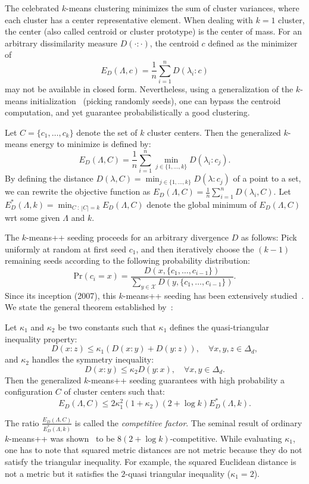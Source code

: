 \documentclass[graybox]{svmult}
\def\calX{\mathcal{X}}
\begin{document}
The celebrated $k$-means clustering minimizes the sum of cluster variances, where each cluster has a center representative element.
When dealing with $k=1$ cluster, the center  (also called  centroid or cluster prototype) is the center of mass.
For an arbitrary dissimilarity measure $D(\cdot:\cdot)$, the centroid $c$ defined as the minimizer of
$$
E_D(\Lambda,c) = \frac{1}{n} \sum_{i=1}^n D(\lambda_i:c)
$$
may not be available in closed form. 
Nevertheless, using a generalization of the $k$-means initialization~\cite{kmeanspp-2007}
(picking randomly seeds), one can bypass the centroid computation, and yet guarantee probabilistically a good clustering.

Let $C=\{c_1,\ldots, c_k\}$ denote the set of $k$ cluster centers.
Then the generalized $k$-means energy to minimize is defined by:
$$
E_D(\Lambda,C) = \frac{1}{n}\sum_{i=1}^n \min_{j\in\{1,\ldots,k\}} D(\lambda_i:c_j).
$$
By defining the distance $D(\lambda,C)=\min_{j\in\{1,\ldots,k\}} D(\lambda:c_j)$ of a point to a set,
we can rewrite the objective function as $E_D(\Lambda,C) = \frac{1}{n}\sum_{i=1}^n D(\lambda_i,C)$.
Let $E_D^*(\Lambda,k)=\min_{C\ :\ |C|=k} E_D(\Lambda,C) $ denote the global minimum of
$E_D(\Lambda,C)$ wrt some given $\Lambda$ and $k$.

The $k$-means++ seeding proceeds for an arbitrary divergence $D$ as follows:
Pick uniformly at random at first seed $c_1$, and then iteratively choose the $(k-1)$ remaining seeds
according to the following probability distribution:
$$
\mathrm{Pr}(c_i=x) = \frac{D(x,\{c_1,\ldots,c_{i-1}\})}{\sum_{y\in\calX} D(y,\{c_1,\ldots,c_{i-1}\})}.
$$
Since its inception (2007), this $k$-means++ seeding has been extensively studied~\cite{Bachem-2016}.
We state the general theorem established by~\cite{tJ-2013}:
\begin{theorem}  
Let $\kappa_1$ and $\kappa_2$ be two constants such that $\kappa_1$ defines the
quasi-triangular inequality property:
$$
D(x:z) \leq \kappa_1 \left(D(x:y)+D(y:z)\right),\quad\forall{}x,y,z\in\Delta_d,
$$
and $\kappa_2$ handles the symmetry inequality:
$$
D(x:y)\leq \kappa_2 D(y:x),\quad\forall x,y\in\Delta_d.
$$
Then the generalized $k$-means++ seeding guarantees with high probability a configuration $C$ of cluster centers such that:
\begin{equation}\label{eq:kmperf}
E_D(\Lambda,C)\leq 2\kappa_1^2(1+\kappa_2)(2+\log k) E_D^*(\Lambda,k).
\end{equation}
\end{theorem}
The ratio $\frac{E_D(\Lambda,C)}{E_D^*(\Lambda,k)}$ is called the {\em competitive factor}.
The seminal result of ordinary $k$-means++ was shown~\cite{kmeanspp-2007} to be $8(2+\log k)$-competitive.
While evaluating $\kappa_1$, one has to note that squared metric distances are not metric because they do not satisfy the triangular inequality.
For example, the squared Euclidean distance is not a metric but it satisfies the $2$-quasi triangular inequality ($\kappa_1=2$).
\end{document}
